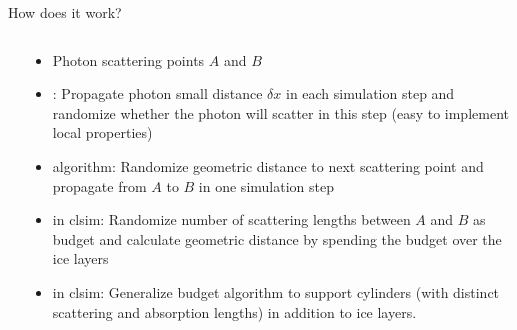 
\begin{frame}[fragile]{How does it work?}

  \begin{columns}
    \begin{column}{0.5\textwidth}
      \begin{overlayarea}{\textwidth}{\textheight}
        \vspace*{2cm}
      \end{overlayarea}
    \end{column}
    \begin{column}{0.5\textwidth}

      \begin{itemize}
        \item Photon scattering points $A$ and $B$
        \item<1> : Propagate photon small distance $\delta x$ in each simulation step and randomize whether the photon will scatter in this step (easy to implement local properties)
        \item<2>  algorithm: Randomize geometric distance to next scattering point and propagate from $A$ to $B$ in one simulation step
        \item<3>  in clsim: Randomize number of scattering lengths between $A$ and $B$ as budget and calculate geometric distance by spending the budget over the ice layers
        \item<4>  in clsim: Generalize budget algorithm to support cylinders (with distinct scattering and absorption lengths) in addition to ice layers.
      \end{itemize}

    \end{column}
  \end{columns}

\end{frame}